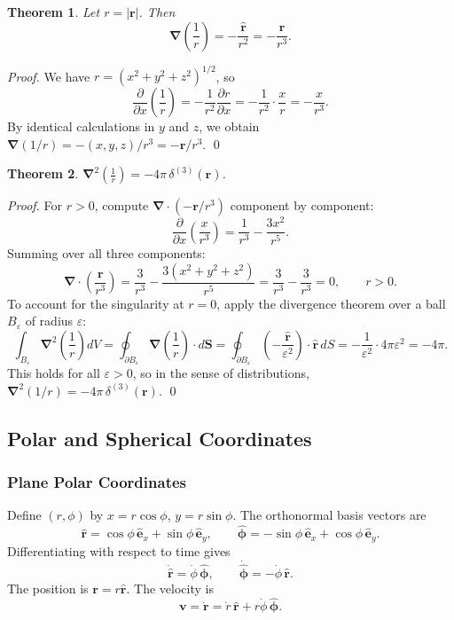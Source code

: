 \documentclass[12pt,a4paper]{article}
\theoremstyle{plain}
\newtheorem{theorem}{Theorem}[section]
\theoremstyle{definition}
\theoremstyle{remark}
\newcommand{\ve}[1]{\mathbf{#1}}           %
\newcommand{\he}[1]{\hat{\mathbf{#1}}}     %
\newcommand{\er}{\hat{\mathbf{r}}}
\newcommand{\ep}{\hat{\boldsymbol{\phi}}}
\newcommand{\rv}{\ve{r}}
\newcommand{\vv}{\ve{v}}
\newcommand{\nab}{\boldsymbol{\nabla}}
\begin{document}
\begin{theorem}\label{thm:grad1r}
Let $r = |\rv|$. Then
\[
  \nab\!\left(\frac{1}{r}\right) = -\frac{\er}{r^2} = -\frac{\rv}{r^3}.
\]
\end{theorem}
\begin{proof}
We have $r=(x^2+y^2+z^2)^{1/2}$, so
\[
  \frac{\partial}{\partial x}\!\left(\frac{1}{r}\right)
  = -\frac{1}{r^2}\frac{\partial r}{\partial x}
  = -\frac{1}{r^2}\cdot\frac{x}{r}
  = -\frac{x}{r^3}.
\]
By identical calculations in $y$ and $z$, we obtain $\nab(1/r) = -(x,y,z)/r^3 = -\rv/r^3$. \qed
\end{proof}

\begin{theorem}\label{thm:lap1r}
$\displaystyle\nab^2\!\left(\frac{1}{r}\right) = -4\pi\,\delta^{(3)}(\rv)$.
\end{theorem}
\begin{proof}
For $r>0$, compute $\nab\cdot(-\rv/r^3)$ component by component:
\[
  \frac{\partial}{\partial x}\!\left(\frac{x}{r^3}\right)
  = \frac{1}{r^3} - \frac{3x^2}{r^5}.
\]
Summing over all three components:
\[
  \nab\cdot\!\left(\frac{\rv}{r^3}\right)
  = \frac{3}{r^3} - \frac{3(x^2+y^2+z^2)}{r^5}
  = \frac{3}{r^3} - \frac{3}{r^3} = 0, \qquad r > 0.
\]
To account for the singularity at $r=0$, apply the divergence theorem over a ball $B_\varepsilon$ of radius $\varepsilon$:
\[
  \int_{B_\varepsilon}\nab^2\!\left(\frac{1}{r}\right)dV
  = \oint_{\partial B_\varepsilon}\nab\!\left(\frac{1}{r}\right)\cdot d\ve{S}
  = \oint_{\partial B_\varepsilon}\!\left(-\frac{\er}{\varepsilon^2}\right)\cdot\er\,dS
  = -\frac{1}{\varepsilon^2}\cdot 4\pi\varepsilon^2
  = -4\pi.
\]
This holds for all $\varepsilon>0$, so in the sense of distributions, $\nab^2(1/r) = -4\pi\,\delta^{(3)}(\rv)$. \qed
\end{proof}

\subsection{Polar and Spherical Coordinates}

\subsubsection{Plane Polar Coordinates}

Define $(r,\phi)$ by $x=r\cos\phi$, $y=r\sin\phi$. The orthonormal basis vectors are
\[
  \er = \cos\phi\,\he{e}_x + \sin\phi\,\he{e}_y,
  \qquad
  \ep = -\sin\phi\,\he{e}_x + \cos\phi\,\he{e}_y.
\]
Differentiating with respect to time gives
\[
  \dot{\er} = \dot{\phi}\,\ep, \qquad \dot{\ep} = -\dot{\phi}\,\er.
\]
The position is $\rv = r\er$. The velocity is
\[
  \vv = \dot{\rv} = \dot{r}\,\er + r\dot{\phi}\,\ep.
\]
\end{document}
